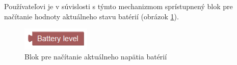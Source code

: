 Používateľovi je v súvislosti s týmto mechanizmom sprístupnený blok pre načítanie hodnoty aktuálneho stavu batérií (obrázok \ref{obr:battery-block}).

\begin{figure}[h]
\centerline{\includegraphics[]{images/battery-block}}
\caption[Blok pre načítanie aktuálneho napätia batérií]{Blok pre načítanie aktuálneho napätia batérií}
\label{obr:battery-block}
\end{figure}

  











